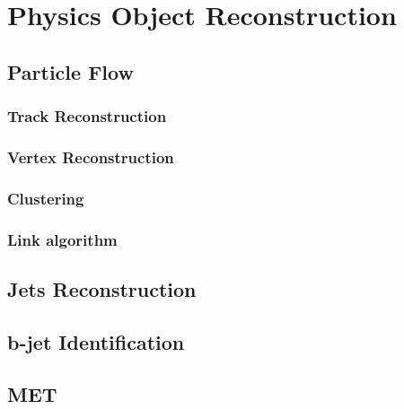 \chapter[Physics Object Reconstruction]{Physics Object Reconstruction}
\label{chap:ParticleID}



\section{Particle Flow}
\label{sec:PF}

\subsection{Track Reconstruction}
\label{subsec:TrackReco}

\subsection{Vertex Reconstruction}
\label{subsec:VertexReco}

\subsection{Clustering}
\label{subsec:Clustering}

\subsection{Link algorithm}
\label{subsec:Linkalgorithm}

\section{Jets Reconstruction}
\label{sec:Jet}

\section{b-jet Identification}
\label{sec:bJet}

\section{MET}
\label{sec:MET}

